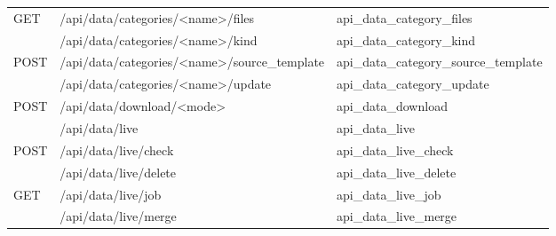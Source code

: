 \begin{longtable}{@{}L{17mm}L{74mm}L{45mm}@{}}
{\scriptsize\sffamily GET} & {\ttfamily\scriptsize /\allowbreak api/\allowbreak data/\allowbreak categories/\allowbreak <name>/\allowbreak files} & {\ttfamily\scriptsize api\_\allowbreak{}data\_\allowbreak{}category\_\allowbreak{}files} \\
 & {\ttfamily\scriptsize /\allowbreak api/\allowbreak data/\allowbreak categories/\allowbreak <name>/\allowbreak kind} & {\ttfamily\scriptsize api\_\allowbreak{}data\_\allowbreak{}category\_\allowbreak{}kind} \\
{\scriptsize\sffamily POST} & {\ttfamily\scriptsize /\allowbreak api/\allowbreak data/\allowbreak categories/\allowbreak <name>/\allowbreak source\_\allowbreak{}template} & {\ttfamily\scriptsize api\_\allowbreak{}data\_\allowbreak{}category\_\allowbreak{}source\_\allowbreak{}template} \\
 & {\ttfamily\scriptsize /\allowbreak api/\allowbreak data/\allowbreak categories/\allowbreak <name>/\allowbreak update} & {\ttfamily\scriptsize api\_\allowbreak{}data\_\allowbreak{}category\_\allowbreak{}update} \\
{\scriptsize\sffamily POST} & {\ttfamily\scriptsize /\allowbreak api/\allowbreak data/\allowbreak download/\allowbreak <mode>} & {\ttfamily\scriptsize api\_\allowbreak{}data\_\allowbreak{}download} \\
 & {\ttfamily\scriptsize /\allowbreak api/\allowbreak data/\allowbreak live} & {\ttfamily\scriptsize api\_\allowbreak{}data\_\allowbreak{}live} \\
{\scriptsize\sffamily POST} & {\ttfamily\scriptsize /\allowbreak api/\allowbreak data/\allowbreak live/\allowbreak check} & {\ttfamily\scriptsize api\_\allowbreak{}data\_\allowbreak{}live\_\allowbreak{}check} \\
 & {\ttfamily\scriptsize /\allowbreak api/\allowbreak data/\allowbreak live/\allowbreak delete} & {\ttfamily\scriptsize api\_\allowbreak{}data\_\allowbreak{}live\_\allowbreak{}delete} \\
{\scriptsize\sffamily GET} & {\ttfamily\scriptsize /\allowbreak api/\allowbreak data/\allowbreak live/\allowbreak job} & {\ttfamily\scriptsize api\_\allowbreak{}data\_\allowbreak{}live\_\allowbreak{}job} \\
 & {\ttfamily\scriptsize /\allowbreak api/\allowbreak data/\allowbreak live/\allowbreak merge} & {\ttfamily\scriptsize api\_\allowbreak{}data\_\allowbreak{}live\_\allowbreak{}merge} \\

\end{longtable}

